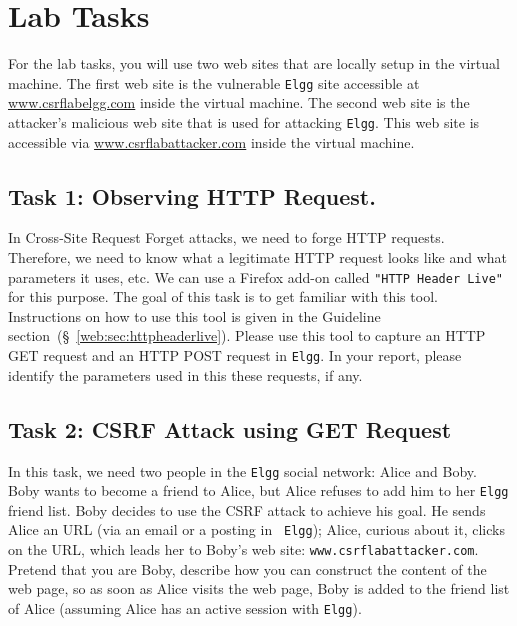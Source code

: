 \section{Lab Tasks}

For the lab tasks, you will use two web sites that are locally setup in
the virtual machine. The first web site is the vulnerable \texttt{Elgg}
site accessible at \url{www.csrflabelgg.com} inside the virtual machine. The second
web site is the attacker's malicious web site that is used for
attacking {\tt Elgg}. This web site is accessible via
\url{www.csrflabattacker.com} inside the virtual machine. 



\subsection{Task 1: Observing HTTP Request.}

In Cross-Site Request Forget attacks, we need to forge HTTP requests. 
Therefore, we need to know what a legitimate HTTP request looks like and 
what parameters it uses, etc. 
We can use a Firefox add-on called \texttt{"HTTP Header Live"} for this
purpose.  
The goal of this task is to get familiar with this tool. 
Instructions on how to use this tool is given in the Guideline
section~(\S~\ref{web:sec:httpheaderlive}).
Please use this tool to capture an HTTP GET request and an HTTP POST
request in \texttt{Elgg}. In your report, please identify the parameters
used in this these requests, if any. 



\subsection{Task 2: CSRF Attack using GET Request}

In this task, we need two people in the {\tt Elgg} social network: Alice
and Boby. Boby wants to become a friend to Alice, but Alice refuses to add 
him to her {\tt Elgg} friend list. Boby decides to use the CSRF attack to
achieve his goal. He sends Alice an URL (via an email or a posting in {\tt
Elgg}); Alice, curious about it, clicks on the URL, which leads her to Boby's web site:    
{\tt www.csrflabattacker.com}. Pretend that you are Boby, describe how you
can construct the content of the web page, so as soon as Alice visits the
web page, Boby is added to the friend list of Alice (assuming Alice has an
active session with {\tt Elgg}).


